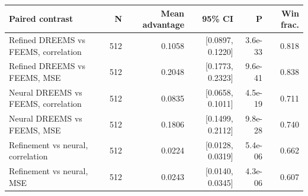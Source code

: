 \begin{tabular}{lrrrrr}
\toprule
Paired contrast & N & Mean advantage & 95\% CI & P & Win frac. \\
\midrule
Refined DREEMS vs FEEMS, correlation & 512 & 0.1058 & [0.0897, 0.1220] & 3.6e-33 & 0.818 \\
Refined DREEMS vs FEEMS, MSE & 512 & 0.2048 & [0.1773, 0.2323] & 9.6e-41 & 0.838 \\
Neural DREEMS vs FEEMS, correlation & 512 & 0.0835 & [0.0658, 0.1011] & 4.5e-19 & 0.711 \\
Neural DREEMS vs FEEMS, MSE & 512 & 0.1806 & [0.1499, 0.2112] & 9.8e-28 & 0.740 \\
Refinement vs neural, correlation & 512 & 0.0224 & [0.0128, 0.0319] & 5.4e-06 & 0.662 \\
Refinement vs neural, MSE & 512 & 0.0243 & [0.0140, 0.0345] & 4.3e-06 & 0.607 \\
\bottomrule
\end{tabular}
